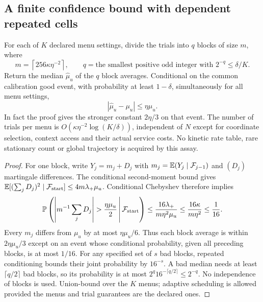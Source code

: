 \subsection{A finite confidence bound with dependent repeated cells}
\begin{theorem}
For each of $K$ declared menu settings, divide the trials into $q$ blocks
of size $m$, where
\begin{equation}
 m=\left\lceil256\kappa\eta^{-2}\right\rceil,
 \qquad
 q=\text{the smallest positive odd integer with }2^{-q}\le\delta/K.
 \label{ra:mom}
\end{equation}
Return the median $\widehat\mu_u$ of the $q$ block averages. Conditional
on the common calibration good event, with probability at least
$1-\delta$, simultaneously for all menu settings,
\begin{equation}
 |\widehat\mu_u-\mu_u|\le\eta\mu_u.
 \label{ra:certificate}
\end{equation}
In fact the proof gives the stronger constant $2\eta/3$ on that event.
The number of trials per menu is
$O(\kappa\eta^{-2}\log(K/\delta))$, independent of $N$ except for
coordinate selection, context access and their actual service costs.
No kinetic rate table, rare stationary count or global trajectory is
acquired by this assay.
\end{theorem}
\begin{proof}
For one block, write $Y_j=m_j+D_j$ with
$m_j=\mathbb E(Y_j\mid\mathcal F_{j-1})$ and $(D_j)$ martingale
differences. The conditional second-moment bound gives
$\mathbb E[(\sum_jD_j)^2\mid\mathcal F_{\rm start}]\le4m\lambda_+\mu_u$.
Conditional Chebyshev therefore implies
\[
 \RAP\left(\left|m^{-1}\sum_jD_j\right|>
        \frac{\eta\mu_u}{2}\,\middle|\,\mathcal F_{\rm start}\right)
 \le\frac{16\lambda_+}{m\eta^2\mu_u}
 \le\frac{16\kappa}{m\eta^2}\le\frac1{16}.
\]
Every $m_j$ differs from $\mu_u$ by at most $\eta\mu_u/6$.
Thus each block average is within $2\eta\mu_u/3$ except on an event
whose conditional probability, given all preceding blocks, is at most
$1/16$. For any specified set of $s$ bad blocks, repeated conditioning
bounds their joint probability by $16^{-s}$. A bad median needs at
least $\lceil q/2\rceil$ bad blocks, so its probability is at most
$2^q16^{-\lceil q/2\rceil}\le2^{-q}$. No independence of blocks is
used. Union-bound over the $K$ menus; adaptive scheduling is allowed
provided the menus and trial guarantees are the declared ones.
\end{proof}

